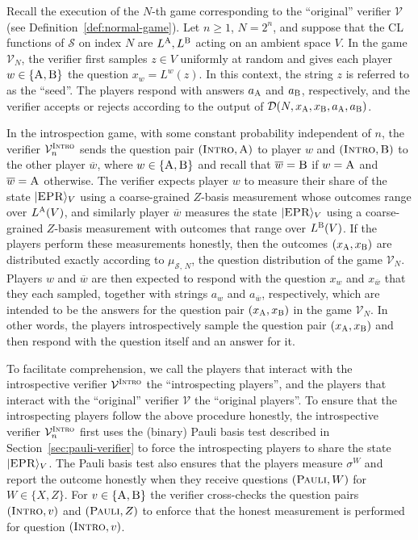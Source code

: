 \documentclass[11pt]{article}
\theoremstyle{definition}
\newcommand{\ket}[1]{|#1\rangle}
\newcommand{\ol}[1]{\overline{#1}}
\newcommand{\sampler}{\mathcal{S}}
\newcommand{\decider}{\mathcal{D}}
\newcommand{\verifier}{\mathcal{V}}
\newcommand{\gamestyle}[1]{\ensuremath{\textsc{#1}}\xspace}
\newcommand{\intro}{\gamestyle{Intro}}
\newcommand{\labelstyle}[1]{\ensuremath{\textsc{#1}}\xspace}
\newcommand{\EPR}{\labelstyle{EPR}}
\newcommand{\trole}{\ensuremath{v}}
\newcommand{\alice}{\labelstyle{A}}
\newcommand{\bob}{\labelstyle{B}}
\newcommand{\typestyle}[1]{\ensuremath{\textsc{#1}}\xspace}
\newcommand{\Pauli}{\typestyle{Pauli}}
\newcommand{\Introspect}{\typestyle{Intro}}
\newcommand{\AB}{\{\alice, \bob\}}
\begin{document}
Recall the execution of the $N$-th game corresponding to the ``original''
verifier $\verifier$ (see Definition~\ref{def:normal-game}).
Let $n\geq 1$, $N=2^n$, and suppose that the CL functions of $\sampler$ on index
$N$ are $L^\alice,L^\bob$ acting on an ambient space $V$.
In the game $\verifier_N$, the verifier first samples $z \in V$ uniformly at
random and gives each player $w\in\AB$ the question $x_w = L^w(z)$.
In this context, the string $z$ is referred to as the ``seed''.
The players respond with answers $a_\alice$ and $a_\bob$, respectively, and the
verifier accepts or rejects according to the output of $\decider(N, x_\alice,
x_\bob, a_\alice, a_\bob)$.

In the introspection game, with some constant probability independent of $n$,
the verifier $\verifier^\intro_n$ sends the question pair $(\Introspect,\alice)$
to player $w$ and $(\Introspect,\bob)$ to the other player $\overline{w}$, where
$w \in \AB$ and recall that $\overline{w}=\bob$ if $w=\alice$ and
$\overline{w}=\alice$ otherwise.
The verifier expects player $w$ to measure their share of the state
$\ket{\EPR}_V$ using a coarse-grained $Z$-basis measurement whose outcomes range
over $L^\alice(V)$, and similarly player $\overline{w}$ measures the state
$\ket{\EPR}_V$ using a coarse-grained $Z$-basis measurement with outcomes that
range over $L^\bob(V)$.
If the players perform these measurements honestly, then the outcomes
$(x_\alice,x_\bob)$ are distributed exactly according to $\mu_{\sampler,\, N}$, the
question distribution of the game $\verifier_N$.
Players $w$ and $\overline{w}$ are then expected to respond with the question
$x_w$ and $x_{\ol{w}}$ that they each sampled, together with strings $a_w$ and
$a_{\overline{w}}$, respectively, which are intended to be the answers for the
question pair $(x_\alice,x_\bob)$ in the game $\verifier_N$.
In other words, the players introspectively sample the question pair
$(x_\alice,x_\bob)$ and then respond with the question itself and an answer for
it.

To facilitate comprehension, we call the players that interact with the
introspective verifier $\verifier^\intro$ the ``introspecting players'', and the
players that interact with the ``original'' verifier $\verifier$ the ``original
players''.
To ensure that the introspecting players follow the above procedure honestly,
the introspective verifier $\verifier^\intro_n$ first uses the (binary) Pauli
basis test described in Section~\ref{sec:pauli-verifier} to force the
introspecting players to share the state $\ket{\EPR}_{V}$.
The Pauli basis test also ensures that the players measure $\sigma^W$ and report
the outcome honestly when they receive questions $(\Pauli, W)$ for $W \in \{X,
Z\}$.
For $v\in\{\alice,\bob\}$ the verifier cross-checks the question pairs
$(\Introspect, \trole)$ and $(\Pauli, Z)$ to enforce that the honest measurement
is performed for question $(\Introspect, \trole)$.
\end{document}
